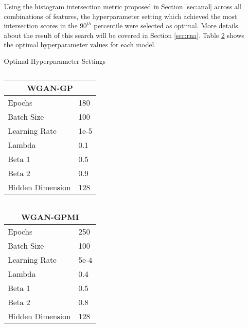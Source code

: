 Using the histogram intersection metric proposed in Section \ref{sec:anal} across all combinations of features, the hyperparameter setting which achieved the most intersection scores in the $90^{th}$ percentile were selected as optimal. More details about the result of this search will be covered in Section \ref{sec:rna}. Table \ref{tab:params} shows the optimal hyperparameter values for each model.

\begin{table}[!htb]
	\centering
	\caption{Optimal Hyperparameter Settings}
	\label{tab:params}
	\begin{subtable}{.5\linewidth}
		\centering
		\caption{}
		\begin{tabular}{l|l}
			\hline
			\multicolumn{2}{c}{\textbf{WGAN-GP}} \\ 
			\hline
			Epochs & 180 \\
			Batch Size & 100 \\
			Learning Rate & 1e-5 \\
			Lambda & 0.1 \\
			Beta 1 & 0.5 \\
			Beta 2 & 0.9 \\
			Hidden Dimension & 128                  
		\end{tabular}
	\end{subtable}%
	\begin{subtable}{.5\linewidth}
		\centering
		\caption{}
		\begin{tabular}{l|l}
			\hline
			\multicolumn{2}{c}{\textbf{ WGAN-GPMI}} \\ 
			\hline
			Epochs & 250 \\
			Batch Size & 100 \\
			Learning Rate & 5e-4 \\
			Lambda & 0.4 \\
			Beta 1 & 0.5 \\
			Beta 2 & 0.8 \\
			Hidden Dimension & 128                  
		\end{tabular}
	\end{subtable}%
\end{table}